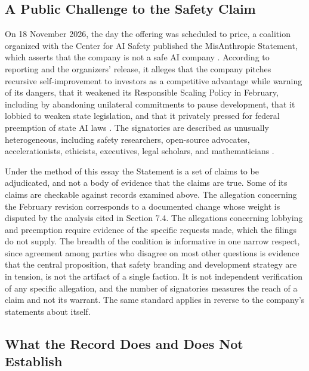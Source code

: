 \documentclass[12pt]{article}
\theoremstyle{definition}
\theoremstyle{remark}
\begin{document}
\subsection{A Public Challenge to the Safety Claim}

On 18 November 2026, the day the offering was scheduled to price, a coalition organized with the Center for AI Safety published the MisAnthropic Statement, which asserts that the company is not a safe AI company \cite{misanthropic2026,lavx2026}. According to reporting and the organizers' release, it alleges that the company pitches recursive self-improvement to investors as a competitive advantage while warning of its dangers, that it weakened its Responsible Scaling Policy in February, including by abandoning unilateral commitments to pause development, that it lobbied to weaken state legislation, and that it privately pressed for federal preemption of state AI laws \cite{lavx2026,cais2026}. The signatories are described as unusually heterogeneous, including safety researchers, open-source advocates, accelerationists, ethicists, executives, legal scholars, and mathematicians \cite{lavx2026}.

Under the method of this essay the Statement is a set of claims to be adjudicated, and not a body of evidence that the claims are true. Some of its claims are checkable against records examined above. The allegation concerning the February revision corresponds to a documented change whose weight is disputed by the analysis cited in Section 7.4. The allegations concerning lobbying and preemption require evidence of the specific requests made, which the filings do not supply. The breadth of the coalition is informative in one narrow respect, since agreement among parties who disagree on most other questions is evidence that the central proposition, that safety branding and development strategy are in tension, is not the artifact of a single faction. It is not independent verification of any specific allegation, and the number of signatories measures the reach of a claim and not its warrant. The same standard applies in reverse to the company's statements about itself.

\subsection{What the Record Does and Does Not Establish}
\end{document}
